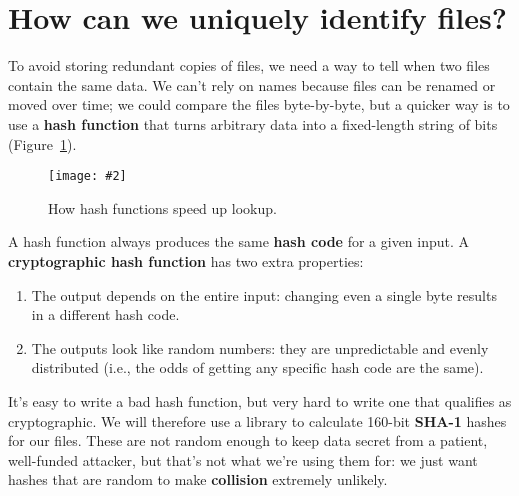 \documentclass[krantzl]{krantz}
\newcommand{\figpdf}[4]{\begin{figure}%
\centering%
\texttt{[image: \#2]}%
\caption{#3}%
\label{#1}%
\end{figure}}
\newcommand{\figref}[1]{Figure~\ref{#1}}
\newcommand{\glossref}[1]{\textbf{#1}}
\begin{document}
\section{How can we uniquely identify files?}\label{file-backup-unique}


To avoid storing redundant copies of files,
we need a way to tell when two files contain the same data.
We can’t rely on names because files can be renamed or moved over time;
we could compare the files byte-by-byte,
but a quicker way is to use a \glossref{hash function}
that turns arbitrary data into a fixed-length string of bits
(\figref{file-backup-hash-function}).

\figpdf{file-backup-hash-function}{./file-backup/hash-function.pdf}{How hash functions speed up lookup.}{0.6}


A hash function always produces the same \glossref{hash code} for a given input.
A \glossref{cryptographic hash function}
has two extra properties:

\begin{enumerate}

\item 

The output depends on the entire input:
    changing even a single byte results in a different hash code.



\item 

The outputs look like random numbers:
    they are unpredictable and evenly distributed
    (i.e., the odds of getting any specific hash code are the same).



\end{enumerate}


It’s easy to write a bad hash function,
but very hard to write one that qualifies as cryptographic.
We will therefore use a library to calculate 160-bit \glossref{SHA-1} hashes for our files.
These are not random enough to keep data secret from a patient, well-funded attacker,
but that’s not what we’re using them for:
we just want hashes that are random to make \glossref{collision} extremely unlikely.
\end{document}
